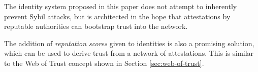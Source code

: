 The identity system proposed in this paper does not attempt to inherently prevent Sybil attacks, but is architected in the hope that attestations by reputable authorities can bootstrap trust into the network.

The addition of \textit{reputation scores} \cite{josang_survey_2007} given to identities is also a promising solution, which can be used to derive trust from a network of attestations. This is similar to the Web of Trust concept shown in Section \ref{sec:web-of-trust}.